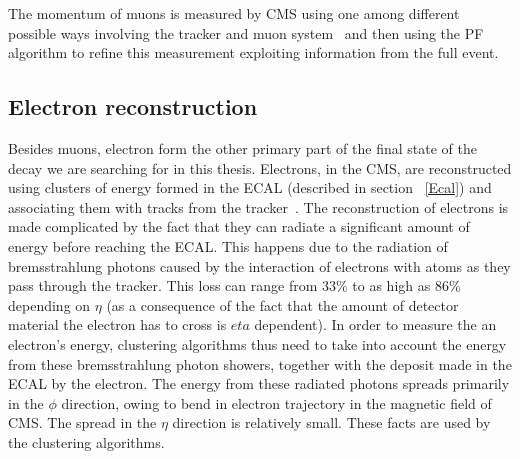 The momentum of muons is measured by CMS using one among different possible ways involving the tracker and muon system~\cite{muon_recon2012} and then using the PF algorithm to refine this measurement exploiting information from the full event.



\subsection{Electron reconstruction}
\label{e_recon}
Besides muons, electron form the other primary part of the final state of the decay we are searching for in this thesis. Electrons, in the CMS, are reconstructed using clusters of energy formed in the ECAL (described in section ~\ref{Ecal}) and associating them with tracks from the tracker~\cite{e_recon}. The reconstruction of electrons is made complicated by the fact that they can radiate a significant amount of energy before reaching the ECAL. This happens due to the radiation of bremsstrahlung photons caused by the interaction of electrons with atoms as they pass through the tracker. This loss can range from 33\% to as high as 86\% depending on $\eta$ (as a consequence of the fact that the amount of detector material the electron has to cross is $eta$ dependent). In order to measure the an electron's energy,  clustering algorithms thus need to take into account the energy from these bremsstrahlung photon showers, together with the deposit made in the ECAL by the electron. The energy from these radiated photons spreads primarily in the $\phi$ direction, owing to bend in electron trajectory in the magnetic field of CMS. The spread in the $\eta$ direction is relatively small. These facts are used by the clustering algorithms.

